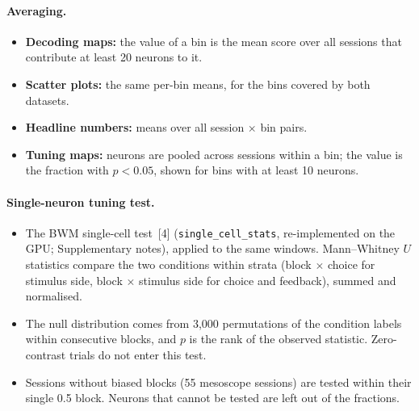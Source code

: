 \documentclass[10pt]{article}
\begin{document}
\paragraph{Averaging.}
\begin{itemize}
  \item \textbf{Decoding maps:} the value of a bin is the mean score over all sessions that contribute at least 20 neurons to it.
  \item \textbf{Scatter plots:} the same per-bin means, for the bins covered by both datasets.
  \item \textbf{Headline numbers:} means over all session $\times$ bin pairs.
  \item \textbf{Tuning maps:} neurons are pooled across sessions within a bin; the value is the fraction with $p < 0.05$, shown for bins with at least 10 neurons.
\end{itemize}

\paragraph{Single-neuron tuning test.}
\begin{itemize}
  \item The BWM single-cell test~[4] (\texttt{single\_cell\_stats}, re-implemented on the GPU; Supplementary notes), applied to the same windows. Mann--Whitney $U$ statistics compare the two conditions within strata (block $\times$ choice for stimulus side, block $\times$ stimulus side for choice and feedback), summed and normalised.
  \item The null distribution comes from 3{,}000 permutations of the condition labels within consecutive blocks, and $p$ is the rank of the observed statistic. Zero-contrast trials do not enter this test.
  \item Sessions without biased blocks (55 mesoscope sessions) are tested within their single 0.5 block. Neurons that cannot be tested are left out of the fractions.
\end{itemize}
\end{document}
